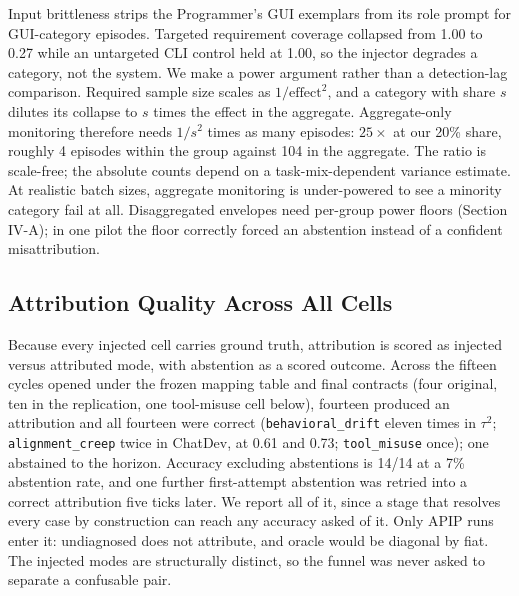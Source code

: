 \documentclass[conference]{IEEEtran}
\begin{document}
Input brittleness strips the Programmer's GUI exemplars from its role prompt for GUI-category episodes. Targeted requirement coverage collapsed from 1.00 to 0.27 while an untargeted CLI control held at 1.00, so the injector degrades a category, not the system. We make a power argument rather than a detection-lag comparison. Required sample size scales as $1/\text{effect}^2$, and a category with share $s$ dilutes its collapse to $s$ times the effect in the aggregate. Aggregate-only monitoring therefore needs $1/s^2$ times as many episodes: $25\times$ at our 20\% share, roughly 4 episodes within the group against 104 in the aggregate. The ratio is scale-free; the absolute counts depend on a task-mix-dependent variance estimate. At realistic batch sizes, aggregate monitoring is under-powered to see a minority category fail at all. Disaggregated envelopes need per-group power floors (Section IV-A); in one pilot the floor correctly forced an abstention instead of a confident misattribution.

\subsection{Attribution Quality Across All Cells}

Because every injected cell carries ground truth, attribution is scored as injected versus attributed mode, with abstention as a scored outcome. Across the fifteen cycles opened under the frozen mapping table and final contracts (four original, ten in the replication, one tool-misuse cell below), fourteen produced an attribution and all fourteen were correct (\texttt{behavioral\_drift} eleven times in $\tau^2$; \texttt{alignment\_creep} twice in ChatDev, at 0.61 and 0.73; \texttt{tool\_misuse} once); one abstained to the horizon. Accuracy excluding abstentions is 14/14 at a 7\% abstention rate, and one further first-attempt abstention was retried into a correct attribution five ticks later. We report all of it, since a stage that resolves every case by construction can reach any accuracy asked of it. Only APIP runs enter it: undiagnosed does not attribute, and oracle would be diagonal by fiat. The injected modes are structurally distinct, so the funnel was never asked to separate a confusable pair.
\end{document}
